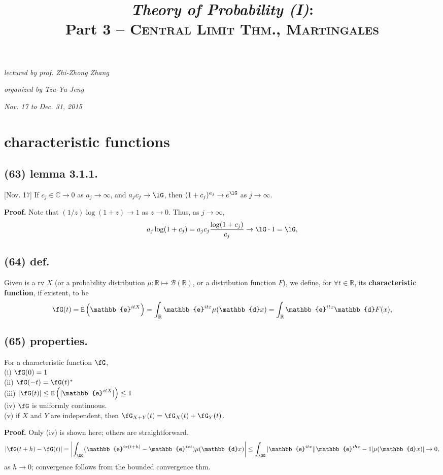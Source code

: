 \documentclass[12pt]{article}
\newcommand{\oo}\infty%
\newcommand{\F}\frac%
\newcommand{\M}\cdot%
\newcommand{\Ev}\forall%
\newcommand{\dd}{ \BF{d} }%
\newcommand{\ee}{ \BF{e} }%
\newcommand{\Rb}[1]{ \left( #1 \right) }%
\newcommand{\Nm}[1]{ \left| #1 \right| } %
\newcommand{\BF}[1]{ \mathbb{#1} }%
\newcommand{\CF}[1]{ \mathcal{#1} }%
\newcommand{\Ss}[1]{\textsf{\bfseries{#1}}}%
\newcommand{\Tw}[1]{\texttt{#1}}%
\newcommand{\EqGo}[1]{ \begin{gather*}{#1}\end{gather*} } %
\newcommand{\E}[1]{ \Tw{E}\Rb{#1} }%
\begin{document}
\title{\textit{\textbf{\huge Theory of Probability (I)}}: \\ Part 3 -- \textsc{Central Limit Thm., Martingales}}
\date{}
\author{}
\maketitle
\allowdisplaybreaks[4]%

\vspace{-3.7cm} %
\hfill{\itshape lectured by prof. Zhi-Zhong Zhang} \par
\hfill{\itshape organized by Tzu-Yu Jeng} \par
\hfill{\itshape Nov. 17 to Dec. 31, 2015} \\
\vspace{-0.7cm} 

\setcounter{section}{6}
\section{characteristic functions}
\subsection*{(63) lemma 3.1.1.} [Nov. 17] If \(c_j \in \BF{C} \to 0\) as \(a_j \to \oo\), 
and \(a_jc_j \to \lG\), then \((1+c_j)^{a_j} \to e^\lG\) as \(j \to \oo\). \par
\Ss{Proof.} Note that \((1/z)\log(1+z) \to 1\) as \(z \to 0\). 
Thus, as \(j \to \oo\), \EqGo{
 a_j \log(1+c_j) = a_j c_j \F{\log(1+c_j)}{c_j} \to \lG \M 1 =\lG,
}

\subsection*{(64) def.} Given is a rv \(X\) (or a probability distribution \(\mu: \BF{R} \mapsto \CF{B}(\BF{R})\), or a distribution function \(F\)), we define, for \(\Ev t \in \BF{R}\), its \Ss{characteristic function}, if existent, to be \EqGo{
 \fG(t) =\E{\ee^{itX}} 
 =\int_{\BF{R}} \ee^{itx} \mu(\dd x) 
 =\int_{\BF{R}} \ee^{itx} \dd F(x),
} 

\subsection*{(65) properties.} For a characteristic function \(\fG\), \\
\indent (i) \(\fG(0)=1\) \\
\indent (ii) \(\fG(-t) = \fG(t)^{*}\) \\
\indent (iii) \(|\fG(t)| \leq \E{|\ee^{itX}|} \leq 1\) \\
\indent (iv) \(\fG\) is uniformly continuous. \\
\indent (v) if \(X\) and \(Y\) are independent, then \(\fG_{X+Y}(t) = \fG_X(t) +\fG_Y(t)\). \par
\Ss{Proof.} Only (iv) is shown here; others are straightforward. \EqGo{
 |\fG(t+h)-\fG(t)|
 = \Nm{ \int_\OG ( \ee^{ix(t+h)} -\ee^{ixt} ) \mu(\dd x) }
 \leq \int_\OG |\ee^{itx}| |\ee^{ihx} -1| \mu(\dd x)|
 \to 0,
} as \(h \to 0\); convergence follows from the bounded convergence thm. 
\end{document}
